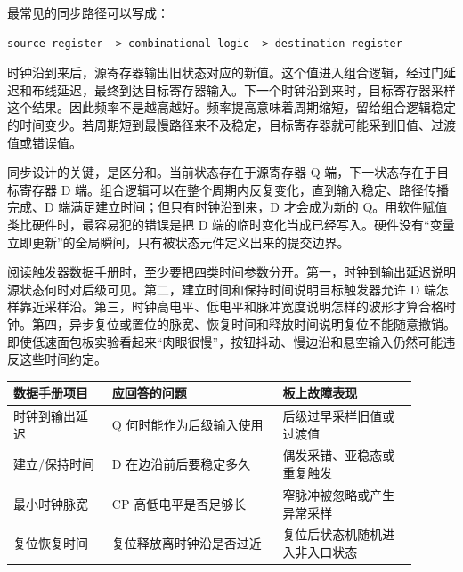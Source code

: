 最常见的同步路径可以写成：

\begin{lstlisting}
source register -> combinational logic -> destination register
\end{lstlisting}
\vspace{1.0em plus 0.35em}

时钟沿到来后，源寄存器输出旧状态对应的新值。这个值进入组合逻辑，经过门延迟和布线延迟，最终到达目标寄存器输入。下一个时钟沿到来时，目标寄存器采样这个结果。因此频率不是越高越好。频率提高意味着周期缩短，留给组合逻辑稳定的时间变少。若周期短到最慢路径来不及稳定，目标寄存器就可能采到旧值、过渡值或错误值。

同步设计的关键，是区分和。当前状态存在于源寄存器 Q 端，下一状态存在于目标寄存器 D 端。组合逻辑可以在整个周期内反复变化，直到输入稳定、路径传播完成、D 端满足建立时间；但只有时钟沿到来，D 才会成为新的 Q。用软件赋值类比硬件时，最容易犯的错误是把 D 端的临时变化当成已经写入。硬件没有“变量立即更新”的全局瞬间，只有被状态元件定义出来的提交边界。

阅读触发器数据手册时，至少要把四类时间参数分开。第一，时钟到输出延迟说明源状态何时对后级可见。第二，建立时间和保持时间说明目标触发器允许 D 端怎样靠近采样沿。第三，时钟高电平、低电平和脉冲宽度说明怎样的波形才算合格时钟。第四，异步复位或置位的脉宽、恢复时间和释放时间说明复位不能随意撤销。即使低速面包板实验看起来“肉眼很慢”，按钮抖动、慢边沿和悬空输入仍然可能违反这些时间约定。

\begin{longtable}{L{0.22\linewidth}L{0.38\linewidth}L{0.3\linewidth}}
\toprule
数据手册项目 & 应回答的问题 & 板上故障表现 \\
\midrule
时钟到输出延迟 & Q 何时能作为后级输入使用 & 后级过早采样旧值或过渡值 \\\tablerowrule
建立/保持时间 & D 在边沿前后要稳定多久 & 偶发采错、亚稳态或重复触发 \\\tablerowrule
最小时钟脉宽 & CP 高低电平是否足够长 & 窄脉冲被忽略或产生异常采样 \\\tablerowrule
复位恢复时间 & 复位释放离时钟沿是否过近 & 复位后状态机随机进入非入口状态 \\
\bottomrule
\end{longtable}
\vspace{1.0em plus 0.35em}

